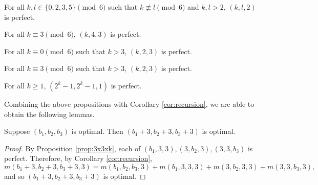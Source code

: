 \begin{prop}
\label{prop:thickness_2_2d_family}
For all $k,l \in \{0,2,3,5\} \pmod 6$ such that $k \not\equiv l \pmod 6$ and $k,l > 2$, $(k,l,2)$ is perfect.
\end{prop}

\begin{prop}
\label{prop:thickness_3_width_4}
For all $k \equiv 3 \pmod 6$, $(k,4,3)$ is perfect.
\end{prop}

\begin{prop}
\label{prop:2x3xk_0}
For all $k \equiv 0 \pmod 6$ such that $k>3$, $(k,2,3)$ is perfect.
\end{prop}

\begin{prop}
\label{prop:2x3xk_3}
For all $k \equiv 3 \pmod 6$ such that $k>3$, $(k,2,3)$ is perfect.
\end{prop}

\begin{prop}
\label{prop:purina}
For all $k \geq 1$, $(2^k-1,2^k-1,1)$ is perfect.
\end{prop}

Combining the above propositions with Corollary \ref{cor:recursion}, we are able to obtain the following lemmas.

\begin{lem}
\label{lem:plus_333}
Suppose $(b_1, b_2, b_3)$ is optimal. Then $(b_1+3, b_2+3, b_3+3)$ is optimal. 
\end{lem}

\begin{proof}
By Proposition \ref{prop:3x3xk}, each of $(b_1,3,3), (3,b_2,3),(3,3,b_3)$ is perfect. Therefore, by Corollary \ref{cor:recursion}, 
$$m(b_1+3, b_2+3, b_3+3, 3) = m(b_1,b_2,b_3,3) + m(b_1,3,3,3) + m(3,b_2,3,3) + m(3,3,b_3,3),$$
and so $(b_1+3, b_2+3, b_3+3)$ is optimal.
\end{proof}




